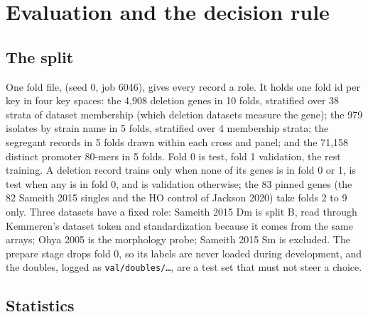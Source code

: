 
\section{Evaluation and the decision rule}
\label{sec:evaluation}

\subsection{The split}
\label{sec:split}

One fold file,  (seed 0, job 6046), gives every
record a role. It holds one fold id per key in four key spaces: the 4{,}908 deletion genes
in 10 folds, stratified over 38 strata of dataset membership (which deletion datasets
measure the gene); the 979 isolates by strain name in 5 folds, stratified over 4 membership
strata; the segregant records in 5 folds drawn within each cross and panel; and the 71{,}158
distinct promoter 80-mers in 5 folds. Fold 0 is test, fold 1 validation, the rest
training. A deletion record trains only when none of its genes is in fold 0 or 1, is test
when any is in fold 0, and is validation otherwise; the 83 pinned genes (the 82 Sameith 2015
singles and the HO control of Jackson 2020) take folds 2 to 9 only. Three datasets have a
fixed role: Sameith 2015 Dm is split B, read through Kemmeren's dataset token and
standardization because it comes from the same arrays; Ohya 2005 is the morphology probe;
Sameith 2015 Sm is excluded. The prepare stage drops fold 0, so its labels are never
loaded during development, and the doubles, logged as \texttt{val/doubles/\ldots}, are a
test set that must not steer a choice.

\subsection{Statistics}
\label{sec:stats}

